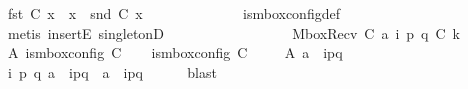 \begin{isabellebody}
\ {\isachardoublequoteopen}fst\ {\isacharparenleft}{\kern0pt}C{}\ x{\isacharparenright}{\kern0pt}\ {\isasymin}\ {\isasymS}{\isacharparenleft}{\kern0pt}x{\isacharparenright}{\kern0pt}\ {\isasymand}\ snd\ {\isacharparenleft}{\kern0pt}C{}\ x{\isacharparenright}{\kern0pt}\ {\isasymin}\ {\isasymM}\isactrlsup {\isacharasterisk}{\kern0pt}{\isachardoublequoteclose}\isanewline
\ \ \ \ \ \ \ \ \ \ \isamarkupfalse%
\ is{\isacharunderscore}{\kern0pt}mbox{\isacharunderscore}{\kern0pt}config{\isacharunderscore}{\kern0pt}def\isanewline
\ \ \ \ \ \ \ \ \ \ \isamarkupfalse%
\ {\isacharparenleft}{\kern0pt}metis\ insertE\ singletonD{\isacharparenright}{\kern0pt}\isanewline
\ \ \ \ \ \ \isamarkupfalse%
\isanewline
\ \ \ \ \isamarkupfalse%
\isanewline
\ \ \isamarkupfalse%
\isanewline
{}\isamarkupfalse%
\isanewline
\ \ \isamarkupfalse%
\ {\isacharparenleft}{\kern0pt}MboxRecv\ C{}\ a\ i\ p\ q\ C{}\ k{\isacharparenright}{\kern0pt}\isanewline
\ \ \isamarkupfalse%
\ A{}{\isacharcolon}{\kern0pt}\ {\isachardoublequoteopen}is{\isacharunderscore}{\kern0pt}mbox{\isacharunderscore}{\kern0pt}config\ C{}{\isachardoublequoteclose}\isanewline
\ \ \isamarkupfalse%
\ {\isachardoublequoteopen}is{\isacharunderscore}{\kern0pt}mbox{\isacharunderscore}{\kern0pt}config\ C{}{\isachardoublequoteclose}\ \isakeywordONE{{\isachardot}{\kern0pt}}\isamarkupfalse%
\isanewline
\ \ \isamarkupfalse%
\ A{}{\isacharcolon}{\kern0pt}\ {\isachardoublequoteopen}a\ {\isacharequal}{\kern0pt}\ {\isacharquery}{\kern0pt}{\isasymlangle}{\isacharparenleft}{\kern0pt}i\isactrlbsup p{\isasymrightarrow}q\isactrlesup {\isacharparenright}{\kern0pt}{\isasymrangle}{\isachardoublequoteclose}\isanewline
\ \ \isamarkupfalse%
\ {\isachardoublequoteopen}{\isasymexists}i\ p\ q{\isachardot}{\kern0pt}\ a\ {\isacharequal}{\kern0pt}\ {\isacharbang}{\kern0pt}{\isasymlangle}{\isacharparenleft}{\kern0pt}i\isactrlbsup p{\isasymrightarrow}q\isactrlesup {\isacharparenright}{\kern0pt}{\isasymrangle}\ {\isasymor}\ a\ {\isacharequal}{\kern0pt}\ {\isacharquery}{\kern0pt}{\isasymlangle}{\isacharparenleft}{\kern0pt}i\isactrlbsup p{\isasymrightarrow}q\isactrlesup {\isacharparenright}{\kern0pt}{\isasymrangle}{\isachardoublequoteclose}\isanewline
\ \ \ \ \isamarkupfalse%
\ blast\isanewline
\ \ \isamarkupfalse%

\end{isabellebody}
